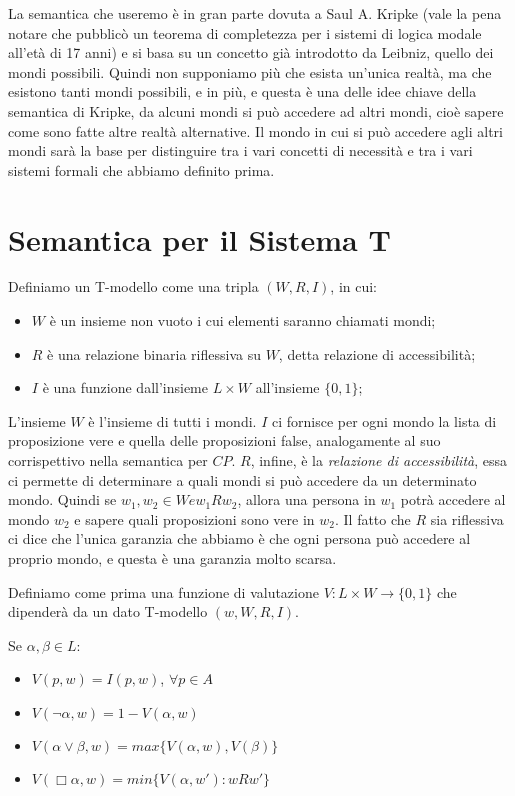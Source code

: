 \documentclass[a4paper, titlepage, 12pt]{report}
\begin{document}
La semantica che useremo è in gran parte dovuta a Saul A. Kripke (vale la pena notare
che pubblicò un teorema di completezza per i sistemi di logica modale all'età di 17 anni)
e si basa su un concetto già introdotto da Leibniz, quello dei mondi possibili.
Quindi non supponiamo più che esista un'unica realtà, ma che esistono tanti mondi possibili,
e in più, e questa è una delle idee chiave della semantica di Kripke, da alcuni mondi
si può accedere ad altri mondi, cioè sapere come sono fatte altre realtà alternative.
Il mondo in cui si può accedere agli altri mondi sarà la base per distinguire
tra i vari concetti di necessità e tra i vari sistemi formali che abbiamo definito prima.

\section{Semantica per il Sistema T}
Definiamo un T-modello come una tripla $(W, R, I)$, in cui:
\begin{itemize}
\item $W$ è un insieme non vuoto i cui elementi saranno chiamati mondi;
\item $R$ è una relazione binaria riflessiva su $W$, detta relazione di accessibilità;
\item $I$ è una funzione dall'insieme $L \times W$ all'insieme $\{0, 1\}$;
\end{itemize}

L'insieme $W$ è l'insieme di tutti i mondi.
$I$ ci fornisce per ogni mondo la lista di proposizione vere
e quella delle proposizioni false, analogamente al suo corrispettivo nella semantica per $CP$.
$R$, infine, è la \textit{relazione di accessibilità},
essa ci permette di determinare a quali mondi si può accedere da un determinato mondo.
Quindi se $w_1, w_2 \in W e w_1 R w_2$, allora una persona in $w_1$ potrà accedere
al mondo $w_2$ e sapere quali proposizioni sono vere in $w_2$.
Il fatto che $R$ sia riflessiva ci dice che l'unica garanzia che abbiamo
è che ogni persona può accedere al proprio mondo, e questa è una garanzia molto scarsa.

Definiamo come prima una funzione di valutazione $V : L \times W \to \{0, 1\}$ che dipenderà da un dato T-modello
$(w, W, R, I)$.

Se $\alpha, \beta \in L$:
\begin{itemize}
\item $V(p, w) = I(p, w)$, $\forall p \in A$
\item $V(\neg \alpha, w) = 1 - V(\alpha, w)$
\item $V(\alpha \vee \beta, w) = max\{V(\alpha, w), V(\beta)\}$
\item $V(\Box \alpha, w) = min\{ V(\alpha, w') : w R w' \}$
\end{itemize}
\end{document}
